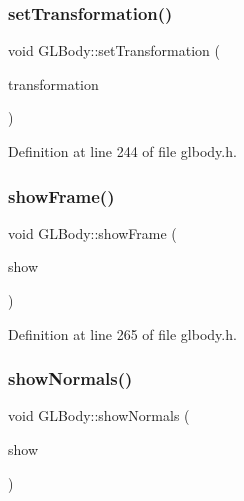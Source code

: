 \mbox{\label{class_g_l_body_a3f49f95804f8635125f107e319a38a01}} 
\subsubsection{\texorpdfstring{setTransformation()}{setTransformation()}}
{\footnotesize\ttfamily void G\+L\+Body\+::set\+Transformation (\begin{DoxyParamCaption}\item[{const Q\+Matrix4x4 \&}]{transformation }\end{DoxyParamCaption})\hspace{0.3cm}{\ttfamily [inline]}}



Definition at line 244 of file glbody.\+h.

\mbox{\label{class_g_l_body_ad7e9267bc3155d72b3623cdf5ecd9595}} 
\subsubsection{\texorpdfstring{showFrame()}{showFrame()}}
{\footnotesize\ttfamily void G\+L\+Body\+::show\+Frame (\begin{DoxyParamCaption}\item[{bool}]{show }\end{DoxyParamCaption})\hspace{0.3cm}{\ttfamily [inline]}}



Definition at line 265 of file glbody.\+h.

\mbox{\label{class_g_l_body_acbf8e07de7e749a6e579ecfb683dbc56}} 
\subsubsection{\texorpdfstring{showNormals()}{showNormals()}}
{\footnotesize\ttfamily void G\+L\+Body\+::show\+Normals (\begin{DoxyParamCaption}\item[{bool}]{show }\end{DoxyParamCaption})\hspace{0.3cm}{\ttfamily [inline]}}



